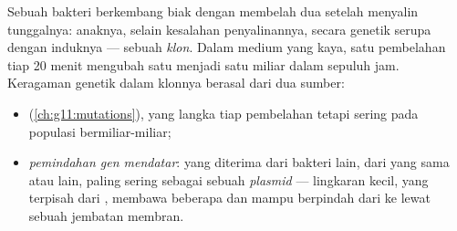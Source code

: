 \begin{proposition}\label{prop:g11:antibiotic-resistance:variation}
Sebuah bakteri berkembang biak dengan membelah dua setelah menyalin
 tunggalnya: anaknya, selain kesalahan penyalinannya, secara
genetik serupa dengan induknya --- sebuah \emph{klon}. Dalam medium
yang kaya, satu pembelahan tiap 20 menit mengubah satu  menjadi satu
miliar dalam sepuluh jam. Keragaman genetik dalam klonnya berasal dari
dua sumber:
\begin{itemize}
  \item \emph{} (\cref{ch:g11:mutations}), yang langka tiap
        pembelahan tetapi sering pada populasi bermiliar-miliar;
  \item \emph{pemindahan gen mendatar}:
         yang diterima dari bakteri lain, dari  yang sama
        atau  lain, paling sering sebagai sebuah \emph{plasmid}
        --- lingkaran  kecil, yang terpisah dari ,
        membawa beberapa  dan mampu berpindah dari  ke  lewat
        sebuah jembatan membran.
\end{itemize}
\end{proposition}
\admitted

